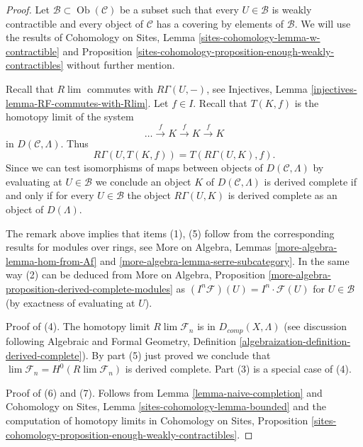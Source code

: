 \documentclass{stacks-project}
\theoremstyle{plain}
\theoremstyle{definition}
\theoremstyle{remark}
\numberwithin{equation}{subsection}
\def\lim{\mathop{\mathrm{lim}}\nolimits}
\def\Ob{\mathop{\mathrm{Ob}}\nolimits}
\begin{document}
\begin{proof}
Let $\mathcal{B} \subset \Ob(\mathcal{C})$ be a subset such that every
$U \in \mathcal{B}$ is weakly contractible and every object of $\mathcal{C}$
has a covering by elements of $\mathcal{B}$.
We will use the results of Cohomology on Sites,
Lemma \ref{sites-cohomology-lemma-w-contractible} and
Proposition \ref{sites-cohomology-proposition-enough-weakly-contractibles}
without further mention.

\medskip\noindent
Recall that $R\lim$ commutes with $R\Gamma(U, -)$,
see Injectives, Lemma \ref{injectives-lemma-RF-commutes-with-Rlim}.
Let $f \in I$. Recall that $T(K, f)$ is the homotopy limit
of the system
$$
\ldots \xrightarrow{f} K \xrightarrow{f} K \xrightarrow{f} K
$$
in $D(\mathcal{C}, \Lambda)$. Thus
$$
R\Gamma(U, T(K, f)) = T(R\Gamma(U, K), f).
$$
Since we can test isomorphisms of maps between objects of
$D(\mathcal{C}, \Lambda)$ by evaluating at $U \in \mathcal{B}$
we conclude an object $K$ of $D(\mathcal{C}, \Lambda)$
is derived complete if and only if for every $U \in \mathcal{B}$ the
object $R\Gamma(U, K)$ is derived complete as an object of $D(\Lambda)$.

\medskip\noindent
The remark above implies that items (1), (5) follow from the corresponding
results for modules over rings, see
More on Algebra, Lemmas \ref{more-algebra-lemma-hom-from-Af} and
\ref{more-algebra-lemma-serre-subcategory}.
In the same way (2) can be deduced from
More on Algebra, Proposition
\ref{more-algebra-proposition-derived-complete-modules}
as $(I^n\mathcal{F})(U) = I^n \cdot \mathcal{F}(U)$
for $U \in \mathcal{B}$ (by exactness of evaluating at $U$).

\medskip\noindent
Proof of (4). The homotopy limit $R\lim \mathcal{F}_n$ is in
$D_{comp}(X, \Lambda)$ (see discussion following
Algebraic and Formal Geometry, Definition
\ref{algebraization-definition-derived-complete}).
By part (5) just proved we conclude that
$\lim \mathcal{F}_n = H^0(R\lim \mathcal{F}_n)$
is derived complete.
Part (3) is a special case of (4).

\medskip\noindent
Proof of (6) and (7). Follows from
Lemma \ref{lemma-naive-completion}
and
Cohomology on Sites, Lemma \ref{sites-cohomology-lemma-bounded}
and the computation of homotopy limits in Cohomology on Sites,
Proposition \ref{sites-cohomology-proposition-enough-weakly-contractibles}.
\end{proof}
\end{document}
